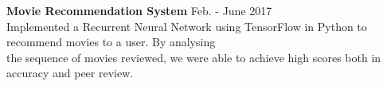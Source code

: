 \documentclass[a4paper]{article}
\newcommand{\myline}{\par
  \kern2pt %
  \hrule height 0.5pt
  \kern2pt %
}
\newcommand{\mybullet}{
	\indent \textbullet \hspace*{2mm}
}
\begin{document}
			\noindent
			\textbf{Movie Recommendation System} \hfill Feb. - June 2017\\
			\mybullet Implemented a Recurrent Neural Network using TensorFlow in Python to recommend 
      movies to a user. By analysing \\ \hspace*{9mm} the sequence of movies reviewed, we were 
      able to achieve high scores both in accuracy and peer review. \\ 

	
		
	

		
\end{document}
